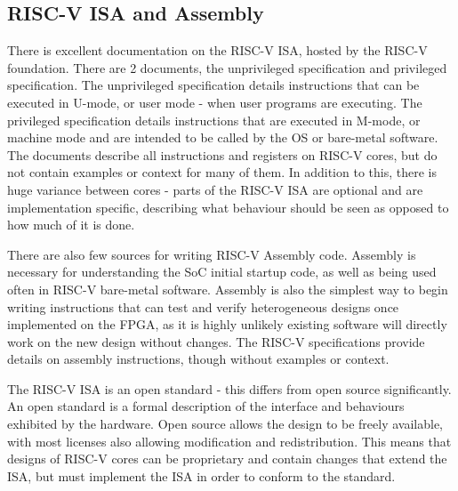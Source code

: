 \subsection{RISC-V ISA and Assembly}
There is excellent documentation on the RISC-V ISA, hosted by the RISC-V foundation. There are 2 documents, the unprivileged specification\cite{} and privileged specification\cite{}. The unprivileged specification details instructions that can be executed in U-mode, or user mode - when user programs are executing. The privileged specification details instructions that are executed in M-mode, or machine mode and are intended to be called by the OS or bare-metal software. The documents describe all instructions and registers on RISC-V cores, but do not contain examples or context for many of them. In addition to this, there is huge variance between cores - parts of the RISC-V ISA are optional and are implementation specific, describing what behaviour should be seen as opposed to how much of it is done.

There are also few sources for writing RISC-V Assembly code. Assembly is necessary for understanding the SoC initial startup code, as well as being used often in RISC-V bare-metal software. Assembly is also the simplest way to begin writing instructions that can test and verify heterogeneous designs once implemented on the FPGA, as it is highly unlikely existing software will directly work on the new design without changes. The RISC-V specifications provide details on assembly instructions, though without examples or context.

The RISC-V ISA is an open standard - this differs from open source significantly. An open standard is a formal description of the interface and behaviours exhibited by the hardware. Open source allows the design to be freely available, with most licenses also allowing modification and redistribution. This means that designs of RISC-V cores can be proprietary and contain changes that extend the ISA, but must implement the ISA in order to conform to the standard.